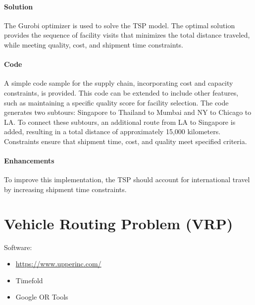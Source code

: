 \paragraph{Solution}
The Gurobi optimizer is used to solve the TSP model. The optimal solution provides the sequence of facility visits that minimizes the total distance traveled, while meeting quality, cost, and shipment time constraints.



\paragraph{Code}

A simple code sample for the supply chain, incorporating cost and capacity constraints, is provided. This code can be extended to include other features, such as maintaining a specific quality score for facility selection. The code generates two subtours: Singapore to Thailand to Mumbai and NY to Chicago to LA. To connect these subtours, an additional route from LA to Singapore is added, resulting in a total distance of approximately 15,000 kilometers. Constraints ensure that shipment time, cost, and quality meet specified criteria.



\paragraph{Enhancements}

To improve this implementation, the TSP should account for international travel by increasing shipment time constraints.



\section{Vehicle Routing Problem (VRP)}
\begin{resource}
Software:
\begin{itemize}
\item \url{https://www.upperinc.com/}
\item Timefold
\item Google OR Tools
\end{itemize}
\end{resource}

